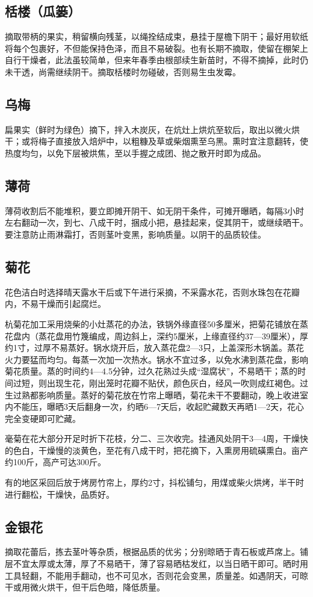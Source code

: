 \documentclass{ctexbook}
\begin{document}
\subsection{栝楼（瓜篓）}
摘取带柄的果实，稍留横向残茎，以绳拴结成束，悬挂于屋檐下阴干；最好用软纸将每个包裹好，不但能保持色泽，而且不易破裂。也有长期不摘取，使留在棚架上自行干燥者，此法虽较简单，但来年春季由根部续生新苗时，不得不摘掉，此时仍未干透，尚需继续阴干。摘取栝楼时勿碰破，否则易生虫发霉。
\subsection{乌梅}
扁果实（鲜时为绿色）摘下，拌入木炭灰，在炕灶上烘炕至软后，取出以微火烘干；或将梅子直接放入焙炉中，以粗糠及草或柴烟熏至乌黑。熏时宜注意翻转，使热度均匀，以免下层被烘焦，至以手握之成团、抛之散开时即为成品。
\subsection{薄荷}
薄荷收割后不能堆积，要立即摊开阴干、如无阴干条件，可摊开曝晒，每隔3小时左右翻动一次，到七、八成干时，捆成小把，悬挂起来，促其阴干，或继续晒干。要注意防止雨淋霜打，否则茎叶变黑，影响质量。以阴干的品质较佳。
\subsection{菊花}
花色洁白时选择晴天露水干后或下午进行采摘，不采露水花，否则水珠包在花瓣内，不易干燥而引起腐烂。

杭菊花加工采用烧柴的小灶蒸花的办法，铁锅外缘直径50多厘米，把菊花铺放在蒸花盘内（蒸花盘用竹篾编成，周边斜上，深约5厘米，上缘直径约37—39厘米），厚约1寸，过厚不易蒸好。锅水烧开后，放入蒸花盘2—3只，上盖深形木锅盖。蒸花火力要猛而均匀。每蒸一次加一次热水。锅水不宜过多，以免水沸到蒸花盘，影响菊花质量。蒸的时间约4—4.5分钟，过久花熟过头成“湿腐状”，不易晒干；蒸的时间过短，则出现生花，刚出笼时花瓣不贴伏，颜色灰白，经风一吹则成红褐色。过生过熟都影响质量。蒸好的菊花放在竹帘上曝晒，菊花未干不要翻动，晚上收进室内不能压，曝晒3天后翻身一次，约晒6—7天后，收起贮藏数天再晒1—2天，花心完全变硬即可贮藏。

毫菊在花大部分开足时折下花枝，分二、三次收完。挂通风处阴干3—4周，干燥快的色白，干燥慢的淡黄色，至花有八成干时，把花摘下，入熏房用硫磺熏白。亩产约100斤，高产可达300斤。

有的地区采回后放于烤房竹帘上，厚约2寸，抖松铺匀，用煤或柴火烘烤，半干时进行翻松，干燥快，品质好。
\subsection{金银花}
摘取花蕾后，拣去茎叶等杂质，根据品质的优劣；分别晾晒于青石板或芦席上。铺层不宜太厚或太薄，厚了不易晒干，薄了容易晒枯发红，以当日晒干即可。晒时用工具轻翻，不能用手翻动，也不可见水，否则花会变黑，质量差。如遇阴天，可晾干或用微火烘干，但干后色暗，降低质量。
\end{document}
